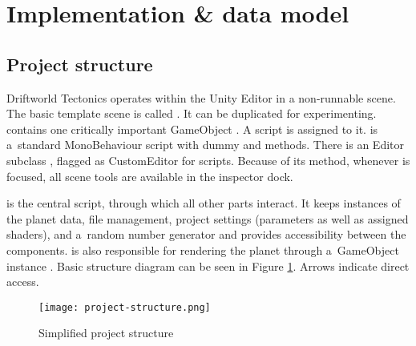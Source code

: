 \section{Implementation \& data model}
\label{sec:implementation}
\subsection{Project structure}
Driftworld Tectonics operates within the Unity Editor in a non-runnable scene. The basic template scene is called . It can be duplicated for experimenting.  contains one critically important GameObject . A script  is assigned to it.  is a~standard MonoBehaviour script with dummy  and  methods. There is an Editor subclass , flagged as CustomEditor for  scripts. Because of its  method, whenever  is focused, all scene tools are available in the inspector dock.

 is the central script, through which all other parts interact. It keeps instances of the planet data, file management, project settings (parameters as well as assigned shaders), and a~random number generator and provides accessibility between the components.  is also responsible for rendering the planet through a~GameObject instance . Basic structure diagram can be seen in Figure \ref{fig:project-structure}. Arrows indicate direct access.
\begin{figure}
\centering
\texttt{[image: project-structure.png]}
\caption{Simplified project structure}
\label{fig:project-structure}
\end{figure}
